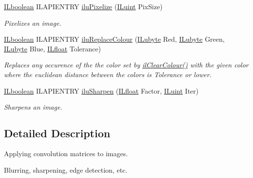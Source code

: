 \begin{DoxyCompactItemize}
\hyperlink{group__il__types_gaa6aa7c95cfdc06b4d8601ef832b7bb0a}{I\+Lboolean} I\+L\+A\+P\+I\+E\+N\+T\+R\+Y \hyperlink{group__ilu__filter_ga609a51f490472174047feaf70918e3ac}{ilu\+Pixelize} (\hyperlink{group__il__types_gaff8e86a1072c8d7cfe387fb87c6ed8e1}{I\+Luint} Pix\+Size)
\begin{DoxyCompactList}\small\item\em Pixelizes an image. \end{DoxyCompactList}\item 
\hyperlink{group__il__types_gaa6aa7c95cfdc06b4d8601ef832b7bb0a}{I\+Lboolean} I\+L\+A\+P\+I\+E\+N\+T\+R\+Y \hyperlink{group__ilu__filter_gac3447a57b322058f1c2e49faa724e4f0}{ilu\+Replace\+Colour} (\hyperlink{group__il__types_ga057357939bc5a12e8061715453568519}{I\+Lubyte} Red, \hyperlink{group__il__types_ga057357939bc5a12e8061715453568519}{I\+Lubyte} Green, \hyperlink{group__il__types_ga057357939bc5a12e8061715453568519}{I\+Lubyte} Blue, \hyperlink{group__il__types_ga376156c9461893f4b1a5de9579dc86f2}{I\+Lfloat} Tolerance)
\begin{DoxyCompactList}\small\item\em Replaces any occurence of the the color set by \hyperlink{group__state_gaca1dc7f7b8e61eb134060c9c8a8b72f2}{il\+Clear\+Colour()} with the given color where the euclidean distance between the colors is {\itshape Tolerance} or lower. \end{DoxyCompactList}\item 
\hyperlink{group__il__types_gaa6aa7c95cfdc06b4d8601ef832b7bb0a}{I\+Lboolean} I\+L\+A\+P\+I\+E\+N\+T\+R\+Y \hyperlink{group__ilu__filter_gab8e36ca96f5766b4c9fd6727d688405a}{ilu\+Sharpen} (\hyperlink{group__il__types_ga376156c9461893f4b1a5de9579dc86f2}{I\+Lfloat} Factor, \hyperlink{group__il__types_gaff8e86a1072c8d7cfe387fb87c6ed8e1}{I\+Luint} Iter)
\begin{DoxyCompactList}\small\item\em Sharpens an image. \end{DoxyCompactList}\end{DoxyCompactItemize}


\subsection{Detailed Description}
Applying convolution matrices to images. 

Blurring, sharpening, edge detection, etc. 

